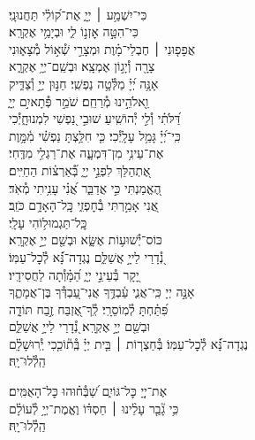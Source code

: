 \documentclass[twoside, openany, parskip=half, 11pt]{book}
\begin{document}
{\begin{narrow}
\\
כִּי־יִשְׁמַ֥ע ׀ יְיָ֑ \hfill אֶת־ק֝וֹלִ֗י תַּחֲנוּנָֽי׃ \\
כִּי־הִטָּ֣ה אׇזְנ֣וֹ לִ֑י \hfill וּבְיָמַ֥י אֶקְרָֽא׃ \\
אֲפָפ֤וּנִי ׀ חֶבְלֵי־מָ֗וֶת \hfill וּמְצָרֵ֣י שְׁ֯א֣וֹל מְ֯צָא֑וּנִי\\ צָרָ֖ה וְ֯יָג֣וֹן אֶמְצָֽא׃ \hfill
וּבְשֵֽׁם־יְיָ֥ אֶקְרָ֑א\\ אָנָּ֥ה יְ֝יָ֗ מַלְּ֯טָ֥ה נַפְשִֽׁי׃ \hfill
חַנּ֣וּן יְיָ֣ וְ֯צַדִּ֑יק\\ וֵ֖אלֹהֵ֣ינוּ מְ֯רַחֵֽם׃ \hfill
שֹׁמֵ֣ר פְּ֯תָאיִ֣ם יְיָ֑\\ דַּ֝לֹּתִ֗י וְ֯לִ֣י יְ֯הוֹשִֽׁיעַ׃ \hfill
שׁוּבִ֣י נַ֭פְשִׁי לִמְנוּחָ֑יְ֯כִי\\ כִּֽי־יְ֝יָ֗ גָּמַ֥ל עָלָֽיְ֯כִי׃ \hfill
כִּ֤י חִלַּ֥צְתָּ נַפְשִׁ֗י מִ֫מָּ֥וֶת\\ אֶת־עֵינִ֥י מִן־דִּמְעָ֑ה \hfill אֶת־רַגְלִ֥י מִדֶּֽחִי׃ \\
אֶ֭תְהַלֵּךְ לִפְנֵ֣י יְיָ֑ \hfill בְּ֯֝אַרְצ֗וֹת הַחַיִּֽים׃ \\
הֶ֭אֱמַנְתִּי כִּ֣י אֲדַבֵּ֑ר \hfill אֲ֝נִ֗י עָנִ֥יתִי מְ֯אֹֽד׃ \\
אֲ֭נִי אָמַ֣רְתִּי בְ֯חׇפְזִ֑י \hfill כׇּֽל־הָאָדָ֥ם כֹּזֵֽב׃ \\

 \hfill
כׇּֽל־תַּגְמוּל֥וֹהִי עָלָֽי׃ \\
כּוֹס־יְ֯שׁוּע֥וֹת אֶשָּׂ֑א \hfill וּבְשֵׁ֖ם יְיָ֣ אֶקְרָֽא׃ \\
נְ֭֯דָרַי לַייָ֣ אֲשַׁלֵּ֑ם \hfill נֶגְדָה־נָּ֗֝א לְ֯כׇל־עַמּֽוֹ׃ \\
יָ֭קָר בְּ֯עֵינֵ֣י יְיָ֑ \hfill הַ֝מָּ֗וְ֯תָה לַחֲסִידָֽיו׃ \\
אָנָּ֣ה יְיָ כִּֽי־אֲנִ֢י עַ֫בְדֶּ֥ךָ \hfill אֲנִי־עַ֭בְדְּ֯ךָ בֶּן־אֲמָתֶ֑ךָ\\ פִּ֝תַּ֗חְתָּ לְ֯מֽוֹסֵרָֽי׃ \hfill
לְֽ֯ךָ־אֶ֭זְבַּח זֶ֣בַח תּוֹדָ֑ה\\ וּבְשֵׁ֖ם יְיָ֣ אֶקְרָֽא׃ \hfill
נְ֭֯דָרַי לַייָ֣ אֲשַׁלֵּ֑ם \\ נֶגְדָה־נָּ֗֝א לְ֯כׇל־עַמּֽוֹ׃ \hfill
בְּ֯חַצְר֤וֹת ׀ בֵּ֤ית יְיָ֗ בְּֽ֯ת֘וֹכֵ֤כִי יְֽ֯רוּשָׁלָ֗‍ִם\\
הַֽלְ֯לוּ־יָֽהּ׃ \hfill \break



אֶת־יְיָ֭ כׇּל־גּוֹיִ֑ם \hfill שַׁ֝בְּ֯ח֗וּהוּ כׇּל־הָאֻמִּֽים׃ \\
כִּ֥י גָ֘בַ֤ר עָלֵ֨ינוּ ׀ חַסְדּ֗וֹ \hfill וֶאֱמֶת־יְיָ֥ לְ֯עוֹלָ֗ם\\
הַֽלְ֯לוּ־יָֽהּ׃ \hfill \break


\end{narrow}}
\end{document}
